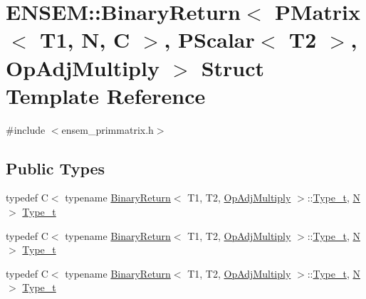 \hypertarget{structENSEM_1_1BinaryReturn_3_01PMatrix_3_01T1_00_01N_00_01C_01_4_00_01PScalar_3_01T2_01_4_00_01OpAdjMultiply_01_4}{}\section{E\+N\+S\+EM\+:\+:Binary\+Return$<$ P\+Matrix$<$ T1, N, C $>$, P\+Scalar$<$ T2 $>$, Op\+Adj\+Multiply $>$ Struct Template Reference}
\label{structENSEM_1_1BinaryReturn_3_01PMatrix_3_01T1_00_01N_00_01C_01_4_00_01PScalar_3_01T2_01_4_00_01OpAdjMultiply_01_4}


{\ttfamily \#include $<$ensem\+\_\+primmatrix.\+h$>$}

\subsection*{Public Types}
\begin{DoxyCompactItemize}
\item 
typedef C$<$ typename \mbox{\hyperlink{structENSEM_1_1BinaryReturn}{Binary\+Return}}$<$ T1, T2, \mbox{\hyperlink{structENSEM_1_1OpAdjMultiply}{Op\+Adj\+Multiply}} $>$\+::\mbox{\hyperlink{structENSEM_1_1BinaryReturn_3_01PMatrix_3_01T1_00_01N_00_01C_01_4_00_01PScalar_3_01T2_01_4_00_01OpAdjMultiply_01_4_adce401cd4364b40ece4bc82a1d0cea68}{Type\+\_\+t}}, \mbox{\hyperlink{adat__devel_2lib_2hadron_2operator__name__util_8cc_a7722c8ecbb62d99aee7ce68b1752f337}{N}} $>$ \mbox{\hyperlink{structENSEM_1_1BinaryReturn_3_01PMatrix_3_01T1_00_01N_00_01C_01_4_00_01PScalar_3_01T2_01_4_00_01OpAdjMultiply_01_4_adce401cd4364b40ece4bc82a1d0cea68}{Type\+\_\+t}}
\item 
typedef C$<$ typename \mbox{\hyperlink{structENSEM_1_1BinaryReturn}{Binary\+Return}}$<$ T1, T2, \mbox{\hyperlink{structENSEM_1_1OpAdjMultiply}{Op\+Adj\+Multiply}} $>$\+::\mbox{\hyperlink{structENSEM_1_1BinaryReturn_3_01PMatrix_3_01T1_00_01N_00_01C_01_4_00_01PScalar_3_01T2_01_4_00_01OpAdjMultiply_01_4_adce401cd4364b40ece4bc82a1d0cea68}{Type\+\_\+t}}, \mbox{\hyperlink{adat__devel_2lib_2hadron_2operator__name__util_8cc_a7722c8ecbb62d99aee7ce68b1752f337}{N}} $>$ \mbox{\hyperlink{structENSEM_1_1BinaryReturn_3_01PMatrix_3_01T1_00_01N_00_01C_01_4_00_01PScalar_3_01T2_01_4_00_01OpAdjMultiply_01_4_adce401cd4364b40ece4bc82a1d0cea68}{Type\+\_\+t}}
\item 
typedef C$<$ typename \mbox{\hyperlink{structENSEM_1_1BinaryReturn}{Binary\+Return}}$<$ T1, T2, \mbox{\hyperlink{structENSEM_1_1OpAdjMultiply}{Op\+Adj\+Multiply}} $>$\+::\mbox{\hyperlink{structENSEM_1_1BinaryReturn_3_01PMatrix_3_01T1_00_01N_00_01C_01_4_00_01PScalar_3_01T2_01_4_00_01OpAdjMultiply_01_4_adce401cd4364b40ece4bc82a1d0cea68}{Type\+\_\+t}}, \mbox{\hyperlink{adat__devel_2lib_2hadron_2operator__name__util_8cc_a7722c8ecbb62d99aee7ce68b1752f337}{N}} $>$ \mbox{\hyperlink{structENSEM_1_1BinaryReturn_3_01PMatrix_3_01T1_00_01N_00_01C_01_4_00_01PScalar_3_01T2_01_4_00_01OpAdjMultiply_01_4_adce401cd4364b40ece4bc82a1d0cea68}{Type\+\_\+t}}
\end{DoxyCompactItemize}


